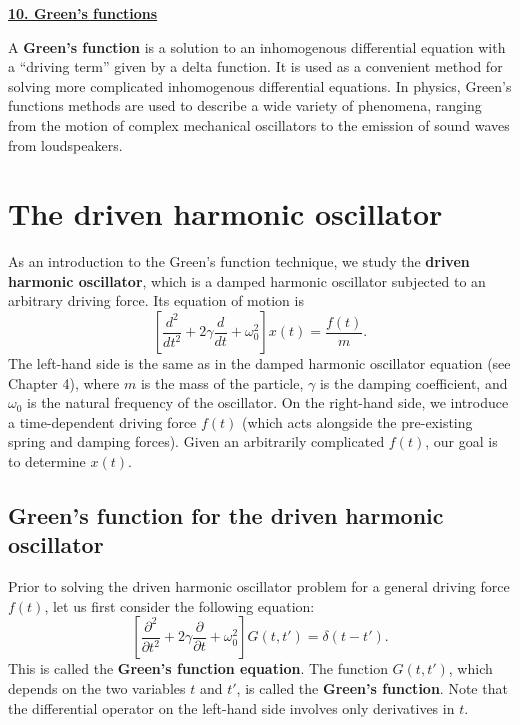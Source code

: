 \documentclass[10pt,a4paper]{article}
\begin{document}
\setcounter{page}{81}
\noindent
\underline{\textbf{\LARGE 10. Green's functions}}
\vskip 0.1in

A \textbf{Green's function} is a solution to an inhomogenous
differential equation with a ``driving term'' given by a delta
function. It is used as a convenient method for solving more
complicated inhomogenous differential equations. In physics, Green's
functions methods are used to describe a wide variety of phenomena,
ranging from the motion of complex mechanical oscillators to the
emission of sound waves from loudspeakers.

\section{The driven harmonic oscillator}
\label{driven-oscillator}

As an introduction to the Green's function technique, we study the
\textbf{driven harmonic oscillator}, which is a damped harmonic
oscillator subjected to an arbitrary driving force. Its equation of
motion is
\begin{equation}
  \left[\frac{d^2}{dt^2} + 2 \gamma \frac{d}{dt} + \omega_0^2\right] x(t) = \frac{f(t)}{m}.
  \label{driven_eq}
\end{equation}
The left-hand side is the same as in the damped harmonic oscillator
equation (see Chapter 4), where $m$ is the mass of the particle,
$\gamma$ is the damping coefficient, and $\omega_0$ is the natural
frequency of the oscillator. On the right-hand side, we introduce a
time-dependent driving force $f(t)$ (which acts alongside the
pre-existing spring and damping forces). Given an arbitrarily
complicated $f(t)$, our goal is to determine $x(t)$.

\subsection{Green's function for the driven harmonic oscillator}
\label{greens-function-for-the-driven-harmonic-oscillator}

Prior to solving the driven harmonic oscillator problem for a general
driving force $f(t)$, let us first consider the following equation:
\begin{equation}
  \left[\frac{\partial^2}{\partial t^2}
    + 2 \gamma \frac{\partial}{\partial t}
    + \omega_0^2\right] G(t, t') = \delta(t-t').
  \label{osc_green}
\end{equation}
This is called the \textbf{Green's function equation}. The function
$G(t,t')$, which depends on the two variables $t$ and $t'$, is called
the \textbf{Green's function}. Note that the differential operator on
the left-hand side involves only derivatives in $t$.
\end{document}
